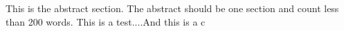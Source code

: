 This is the abstract section. The abstract should be one section and count less than 200 words. This is a test....And this is a c